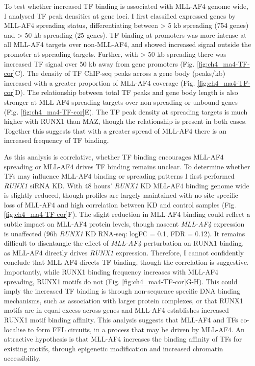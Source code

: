 To test whether increased TF binding is associated with MLL-AF4 genome wide, I analysed TF peak densities at gene loci. I first classified expressed genes by MLL-AF4 spreading status, differentiating between > 5 kb spreading (754 genes) and > 50 kb spreading (25 genes). TF binding at promoters was more intense at all MLL-AF4 targets over non-MLL-AF4, and showed increased signal outside the promoter at spreading targets. Further, with > 50 kb spreading there was increased TF signal over 50 kb away from gene promoters (Fig. \ref{fig:ch4_ma4-TF-cor}C). The density of TF ChIP-seq peaks across a gene body (peaks/kb) increased with a greater proportion of MLL-AF4 coverage (Fig. \ref{fig:ch4_ma4-TF-cor}D). The relationship between total TF peaks and gene body length is also stronger at MLL-AF4 spreading targets over non-spreading or unbound genes (Fig. \ref{fig:ch4_ma4-TF-cor}E). The TF peak density at spreading targets is much higher with RUNX1 than MAZ, though the relationship is present in both cases. Together this suggests that with a greater spread of MLL-AF4 there is an increased frequency of TF binding. 

As this analysis is correlative, whether TF binding encourages MLL-AF4 spreading or MLL-AF4 drives TF binding remains unclear. To determine whether TFs may influence MLL-AF4 binding or spreading patterns I first performed \textit{RUNX1} siRNA KD. With 48 hours' \textit{RUNX1} KD MLL-AF4 binding genome wide is slightly reduced, though profiles are largely maintained with no site-specific loss of MLL-AF4 and high correlation between KD and control samples (Fig. \ref{fig:ch4_ma4-TF-cor}F). The slight reduction in MLL-AF4 binding could reflect a subtle impact on MLL-AF4 protein levels, though nascent \textit{MLL-AF4} expression is unaffected (96h \textit{RUNX1} KD RNA-seq: logFC = 0.1, FDR = 0.12). It remains difficult to disentangle the effect of \textit{MLL-AF4} perturbation on RUNX1 binding, as MLL-AF4 directly drives \textit{RUNX1} expression. Therefore, I cannot confidently conclude that MLL-AF4 directs TF binding, though the correlation is suggestive. Importantly, while RUNX1 binding frequency increases with MLL-AF4 spreading, RUNX1 motifs do not (Fig. \ref{fig:ch4_ma4-TF-cor}G-H). This could imply the increased TF binding is through non-sequence specific DNA binding mechanisms, such as association with larger protein complexes, or that RUNX1 motifs are in equal excess across genes and MLL-AF4 establishes increased RUNX1 motif binding affinity. This analysis suggests that MLL-AF4 and TFs co-localise to form FFL circuits, in a process that may be driven by MLL-AF4. An attractive hypothesis is that MLL-AF4 increases the binding affinity of TFs for existing motifs, through epigenetic modification and increased chromatin accessibility.

